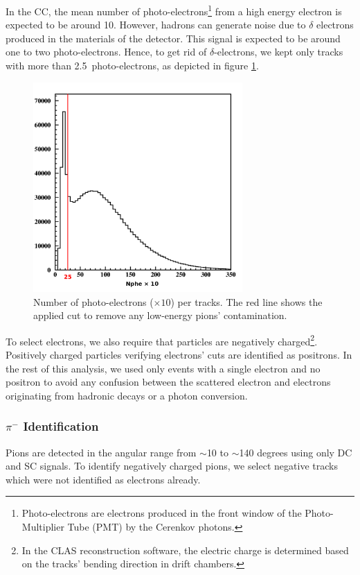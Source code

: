 In the CC, the mean number of photo-electrons\footnote{Photo-electrons are 
electrons produced in the front window of the Photo-Multiplier Tube (PMT) by the Cerenkov photons.} from a high energy electron is expected to be around 10.
However, hadrons can generate noise due to $\delta$ electrons produced in 
the materials of the detector. This signal is expected to be around 
one to two photo-electrons. Hence, to get rid of $\delta$-electrons, we kept only tracks with more than 2.5~photo-electrons, as depicted in figure \ref{delta}. 

\begin{figure}[tbp]
\centering
\includegraphics[width=8cm] {chap5-fig/fig04.png} 
\caption {Number of photo-electrons ($\times 10$) per tracks. The red line 
shows the applied cut to remove any low-energy pions' contamination.}
\label{delta}
\end{figure}

To select electrons, we also require that particles are negatively charged\footnote{In the CLAS reconstruction software, the electric charge is determined based on the tracks' bending direction in drift chambers.}.
Positively charged particles verifying electrons' cuts are identified as 
positrons. In the rest of this analysis, we used only events with a single electron and no positron to avoid any confusion between the scattered electron and electrons originating from hadronic decays or a photon conversion.

\subsubsection{$\pi^-$ Identification}
\label{PiId}

Pions are detected in the angular range from $\sim$10 to $\sim$140 degrees 
using only DC and SC signals. To identify negatively charged pions, we select 
negative tracks which were not identified as electrons already. 

